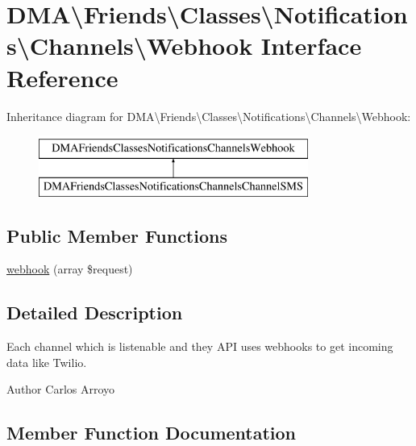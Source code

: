 \hypertarget{interfaceDMA_1_1Friends_1_1Classes_1_1Notifications_1_1Channels_1_1Webhook}{}\section{D\+M\+A\textbackslash{}Friends\textbackslash{}Classes\textbackslash{}Notifications\textbackslash{}Channels\textbackslash{}Webhook Interface Reference}
\label{interfaceDMA_1_1Friends_1_1Classes_1_1Notifications_1_1Channels_1_1Webhook}
Inheritance diagram for D\+M\+A\textbackslash{}Friends\textbackslash{}Classes\textbackslash{}Notifications\textbackslash{}Channels\textbackslash{}Webhook\+:\begin{figure}[H]
\begin{center}
\leavevmode
\includegraphics[height=2.000000cm]{d8/d62/interfaceDMA_1_1Friends_1_1Classes_1_1Notifications_1_1Channels_1_1Webhook}
\end{center}
\end{figure}
\subsection*{Public Member Functions}
\begin{DoxyCompactItemize}
\item 
\hyperlink{interfaceDMA_1_1Friends_1_1Classes_1_1Notifications_1_1Channels_1_1Webhook_a2836b9b100c55f657ee432bf3a7c9055}{webhook} (array \$request)
\end{DoxyCompactItemize}


\subsection{Detailed Description}
Each channel which is listenable and they A\+P\+I uses webhooks to get incoming data like Twilio. \begin{DoxyAuthor}{Author}
Carlos Arroyo 
\end{DoxyAuthor}


\subsection{Member Function Documentation}
\hypertarget{interfaceDMA_1_1Friends_1_1Classes_1_1Notifications_1_1Channels_1_1Webhook_a2836b9b100c55f657ee432bf3a7c9055}{}
